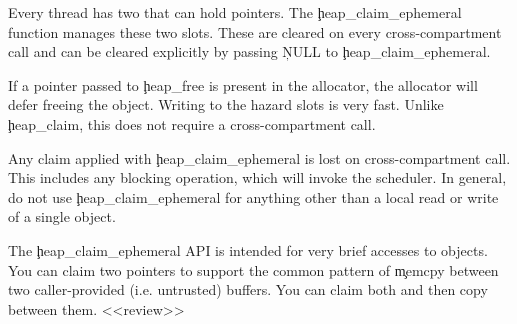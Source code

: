 Every thread has two  that can hold pointers.
The \c{heap_claim_ephemeral} function manages these two slots.
These are cleared on every cross-compartment call and can be cleared explicitly by passing \c{NULL} to \c{heap_claim_ephemeral}.

If a pointer passed to \c{heap_free} is present in the allocator, the allocator will defer freeing the object.
Writing to the hazard slots is very fast.
Unlike \c{heap_claim}, this does not require a cross-compartment call.

\begin{caution}
	Any claim applied with \c{heap_claim_ephemeral} is lost on  cross-compartment call.
	This includes any blocking operation, which will invoke the scheduler.
	In general, do not use \c{heap_claim_ephemeral} for anything other than a local read or write of a single object.
\end{caution}

The \c{heap_claim_ephemeral} API is intended for very brief accesses to objects.
You can claim two pointers to support the common pattern of \c{memcpy} between two caller-provided (i.e. untrusted) buffers.
You can claim both and then copy between them.
<<review>>
